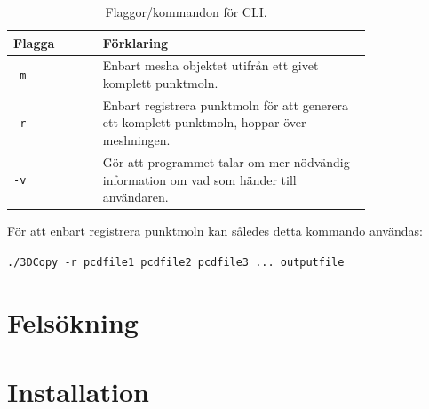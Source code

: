 \documentclass[a4paper,titlepage,12pt]{article}
\begin{document}
		\begin{table}[h!]
			\centering
			\caption{Flaggor/kommandon för CLI.}
			\label{tab:flaggor_cli}
			
			\begin{tabular}{p{0.2\linewidth}p{0.6\linewidth}}
				Flagga & Förklaring \\
				\hline
				\texttt{-m} & Enbart mesha objektet utifrån ett givet komplett punktmoln. \\
				\hline
				\texttt{-r} & Enbart registrera punktmoln för att generera ett komplett punktmoln, hoppar över meshningen. \\
				\hline
				\texttt{-v} & Gör att programmet talar om mer nödvändig information om vad som händer till användaren. \\
				\hline
			\end{tabular}
		\end{table}	
		
		För att enbart registrera punktmoln kan således detta kommando användas:
		
		\texttt{./3DCopy -r pcdfile1 pcdfile2 pcdfile3 ... outputfile}
\newpage
    
\section{Felsökning}
\newpage
    
\section{Installation}
\newpage
\end{document}

